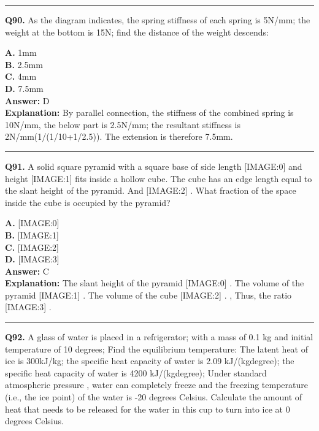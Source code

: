 \documentclass[12pt]{article}
\begin{document}
\hrule
\vspace{1em}


\noindent
\textbf{Q90.} As the diagram indicates, the spring stiffness of each spring is 5N/mm; the weight at the bottom is 15N; find the distance of the weight descends:



\textbf{A.} 1mm \\
\textbf{B.} 2.5mm \\
\textbf{C.} 4mm \\
\textbf{D.} 7.5mm \\

\textbf{Answer:} D \\
\textbf{Explanation:} By parallel connection, the stiffness of the combined spring is 10N/mm, the below part is 2.5N/mm; the resultant stiffness is 2N/mm(1/(1/10+1/2.5)). The extension is therefore 7.5mm.

\hrule
\vspace{1em}


\noindent
\textbf{Q91.} A solid square pyramid with a square base of side length
[IMAGE:0]
and height
[IMAGE:1]
fits inside a hollow cube. The cube has an edge length equal to the slant height of the pyramid. And
[IMAGE:2]
. What fraction of the space inside the cube is occupied by the pyramid?



\textbf{A.} [IMAGE:0] \\
\textbf{B.} [IMAGE:1] \\
\textbf{C.} [IMAGE:2] \\
\textbf{D.} [IMAGE:3] \\

\textbf{Answer:} C \\
\textbf{Explanation:} The slant height of the pyramid
[IMAGE:0]
. The volume of the pyramid
[IMAGE:1]
. The volume of the cube
[IMAGE:2]
. , Thus, the ratio
[IMAGE:3]
.

\hrule
\vspace{1em}


\noindent
\textbf{Q92.} A glass of water is placed in a refrigerator; with a mass of 0.1 kg and initial temperature of 10 degrees; Find the equilibrium temperature: The latent heat of ice is 300kJ/kg; the specific heat capacity of water is 2.09 kJ/(kg\cdot degree); the specific heat capacity of water is 4200 kJ/(kg\cdot degree); Under standard atmospheric pressure , water can completely freeze and the freezing temperature (i.e., the ice point) of the water is -20 degrees Celsius.
Calculate the amount of heat that needs to be released for the water in this cup to turn into ice at 0 degrees Celsius.
\end{document}
